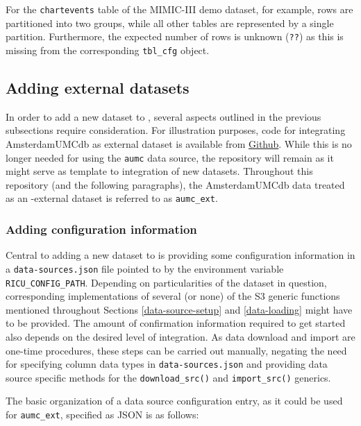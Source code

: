 \documentclass[
  notitle]{jss}
\begin{document}
For the \texttt{chartevents} table of the MIMIC-III demo dataset, for
example, rows are partitioned into two groups, while all other tables
are represented by a single partition. Furthermore, the expected number
of rows is unknown (\texttt{??}) as this is missing from the
corresponding \texttt{tbl\_cfg} object.

\hypertarget{adding-external-datasets}{%
\subsection{Adding external datasets}\label{adding-external-datasets}}

In order to add a new dataset to , several aspects outlined in
the previous subsections require consideration. For illustration
purposes, code for integrating AmsterdamUMCdb as external dataset is
available from \href{https://github.com/eth-mds/aumc}{Github}. While
this is no longer needed for using the \texttt{aumc} data source, the
repository will remain as it might serve as template to integration of
new datasets. Throughout this repository (and the following paragraphs),
the AmsterdamUMCdb data treated as an -external dataset is
referred to as \texttt{aumc\_ext}.

\hypertarget{adding-configuration-information}{%
\subsubsection{Adding configuration
information}\label{adding-configuration-information}}

Central to adding a new dataset to  is providing some
configuration information in a \texttt{data-sources.json} file pointed
to by the environment variable \texttt{RICU\_CONFIG\_PATH}. Depending on
particularities of the dataset in question, corresponding
implementations of several (or none) of the S3 generic functions
mentioned throughout Sections \ref{data-source-setup} and
\ref{data-loading} might have to be provided. The amount of confirmation
information required to get started also depends on the desired level of
integration. As data download and import are one-time procedures, these
steps can be carried out manually, negating the need for specifying
column data types in \texttt{data-sources.json} and providing data
source specific methods for the \texttt{download\_src()} and
\texttt{import\_src()} generics.

The basic organization of a data source configuration entry, as it could
be used for \texttt{aumc\_ext}, specified as JSON is as follows:
\end{document}
